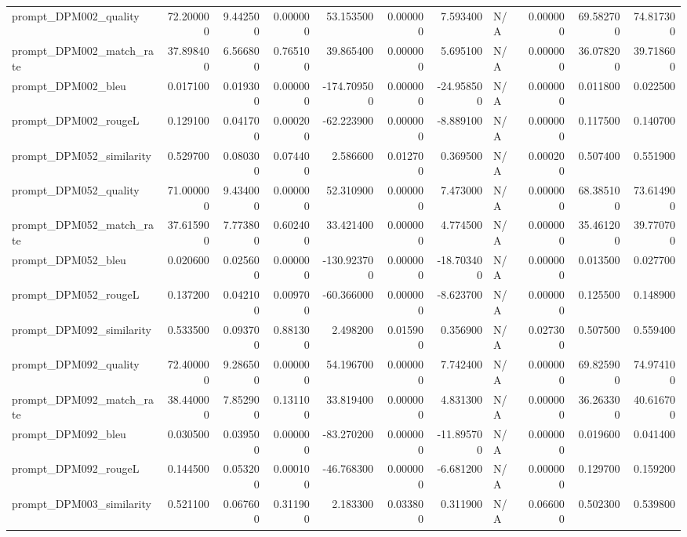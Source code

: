 \begin{tabular}{lrrrrrrlrrr}
prompt_DPM002_quality & 72.200000 & 9.442500 & 0.000000 & 53.153500 & 0.000000 & 7.593400 & N/A & 0.000000 & 69.582700 & 74.817300 \\
prompt_DPM002_match_rate & 37.898400 & 6.566800 & 0.765100 & 39.865400 & 0.000000 & 5.695100 & N/A & 0.000000 & 36.078200 & 39.718600 \\
prompt_DPM002_bleu & 0.017100 & 0.019300 & 0.000000 & -174.709500 & 0.000000 & -24.958500 & N/A & 0.000000 & 0.011800 & 0.022500 \\
prompt_DPM002_rougeL & 0.129100 & 0.041700 & 0.000200 & -62.223900 & 0.000000 & -8.889100 & N/A & 0.000000 & 0.117500 & 0.140700 \\
prompt_DPM052_similarity & 0.529700 & 0.080300 & 0.074400 & 2.586600 & 0.012700 & 0.369500 & N/A & 0.000200 & 0.507400 & 0.551900 \\
prompt_DPM052_quality & 71.000000 & 9.434000 & 0.000000 & 52.310900 & 0.000000 & 7.473000 & N/A & 0.000000 & 68.385100 & 73.614900 \\
prompt_DPM052_match_rate & 37.615900 & 7.773800 & 0.602400 & 33.421400 & 0.000000 & 4.774500 & N/A & 0.000000 & 35.461200 & 39.770700 \\
prompt_DPM052_bleu & 0.020600 & 0.025600 & 0.000000 & -130.923700 & 0.000000 & -18.703400 & N/A & 0.000000 & 0.013500 & 0.027700 \\
prompt_DPM052_rougeL & 0.137200 & 0.042100 & 0.009700 & -60.366000 & 0.000000 & -8.623700 & N/A & 0.000000 & 0.125500 & 0.148900 \\
prompt_DPM092_similarity & 0.533500 & 0.093700 & 0.881300 & 2.498200 & 0.015900 & 0.356900 & N/A & 0.027300 & 0.507500 & 0.559400 \\
prompt_DPM092_quality & 72.400000 & 9.286500 & 0.000000 & 54.196700 & 0.000000 & 7.742400 & N/A & 0.000000 & 69.825900 & 74.974100 \\
prompt_DPM092_match_rate & 38.440000 & 7.852900 & 0.131100 & 33.819400 & 0.000000 & 4.831300 & N/A & 0.000000 & 36.263300 & 40.616700 \\
prompt_DPM092_bleu & 0.030500 & 0.039500 & 0.000000 & -83.270200 & 0.000000 & -11.895700 & N/A & 0.000000 & 0.019600 & 0.041400 \\
prompt_DPM092_rougeL & 0.144500 & 0.053200 & 0.000100 & -46.768300 & 0.000000 & -6.681200 & N/A & 0.000000 & 0.129700 & 0.159200 \\
prompt_DPM003_similarity & 0.521100 & 0.067600 & 0.311900 & 2.183300 & 0.033800 & 0.311900 & N/A & 0.066000 & 0.502300 & 0.539800 \\

\end{tabular}
